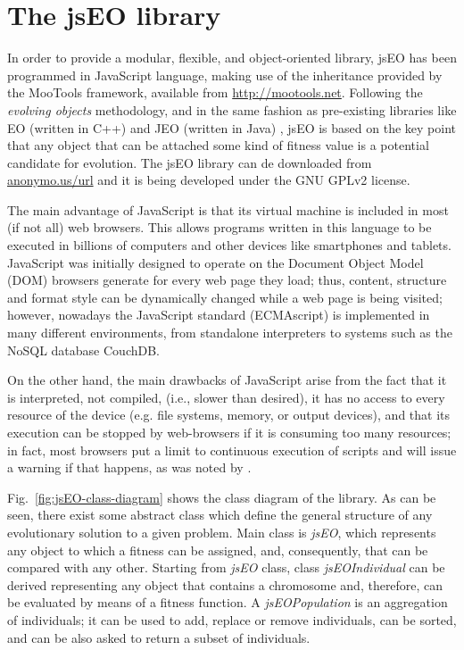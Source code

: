 \documentclass[runningheads,a4paper]{llncs}
\begin{document}
\section{The jsEO library}
\label{sec:jseo}
In order to provide a modular, flexible, and object-oriented library,
jsEO has been programmed in JavaScript language, making use of the
inheritance provided by the MooTools framework, available from
\url{http://mootools.net}.  %
Following the {\em evolving objects}
methodology, and in the same fashion as pre-existing
libraries like EO (written in C++) \cite{EO:FEA2000} and JEO (written
in Java) \cite{maribel:jp2001}, 
jsEO is based on the key point that any object that can be attached
some kind of fitness value is a potential candidate for evolution. The
jsEO library can de downloaded from 
\url{anonymo.us/url}
and it
is being developed under the GNU GPLv2 license. 

The main advantage of JavaScript  is that its virtual machine is
included  in most (if not all) web browsers. This allows programs
written in this language to be executed in billions of computers and
other devices like smartphones and tablets. JavaScript was initially 
designed to operate on the Document Object Model (DOM) browsers
generate for every web page they load; thus, content, structure and
format style can be dynamically changed while a web page is being
visited; however, nowadays the JavaScript standard (ECMAscript) is
implemented in many different environments, from standalone
interpreters to systems such as the NoSQL database CouchDB. 

On the other hand, the main drawbacks of JavaScript  arise from the fact that
it is interpreted, not compiled, (i.e., slower than desired), it has
no access to every resource of the device (e.g. file systems,  memory,
or output devices), and that its execution can be stopped by
web-browsers if it is consuming too many resources; in fact, most
browsers put a limit to continuous execution of scripts and will issue
a warning if that happens, as was noted by
\cite{gecco07:workshop:dcor}. 

Fig.~\ref{fig:jsEO-class-diagram} shows the class diagram of the
library. As can be seen, there exist some abstract class which define
the general structure of any evolutionary solution to a given
problem. Main class is \textit{jsEO}, which represents any object to
which a fitness can be assigned, and, consequently, that can be
compared with any other. Starting from \textit{jsEO} class, class
\textit{jsEOIndividual} can be derived representing any object that
contains a chromosome and, therefore, can be evaluated by means of a
fitness function. A \textit{jsEOPopulation} is an aggregation of
individuals; it can be used to add, replace or remove individuals, can
be sorted, and can be also asked to return a subset of individuals. 
\end{document}
